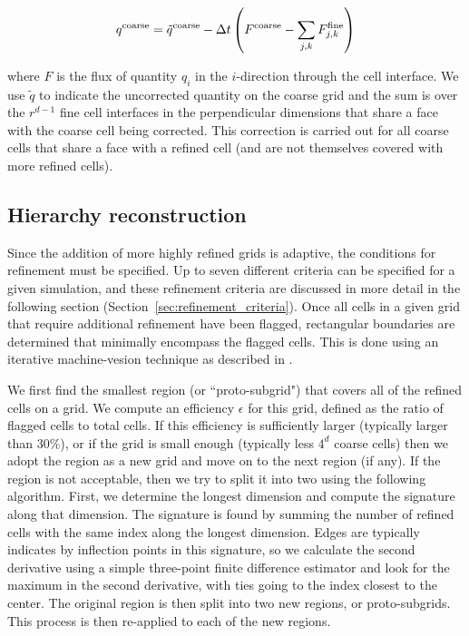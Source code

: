 \begin{equation}
  q^{\rm coarse} = \tilde{q}^{\rm coarse} - \Delta t \left( F^{\rm
      coarse} - \sum_{j,k} F^{\rm fine}_{j,k} \right)
\end{equation}

where $F$ is the flux of quantity $q_i$ in the $i$-direction through the cell interface.   We use $\tilde{q}$ to indicate the uncorrected quantity on the coarse grid and the sum is over the $r^{d-1}$ fine cell interfaces in the perpendicular dimensions that share a face with the coarse cell being corrected.  This correction is carried out for all coarse cells that share a face with a refined cell (and are not themselves covered with more refined cells).

\subsection{Hierarchy reconstruction}
\label{sec:hierarchy_reconstruction}

Since the addition of more highly refined grids is adaptive, the conditions for refinement must be specified.  Up to seven different criteria can be specified for a given simulation, and these refinement criteria are discussed in more detail in the following section (Section~\ref{sec:refinement_criteria}).   Once all cells in a given grid that require additional refinement have been flagged, rectangular boundaries are determined that minimally encompass the flagged cells.  This is done using an iterative machine-vesion technique as described in .  

We first find the smallest region (or ``proto-subgrid") that covers all of the refined cells on a grid.  We compute an efficiency $\epsilon$ for this grid, defined as the ratio of flagged cells to total cells.  If this efficiency is sufficiently larger (typically larger than 30\%), or if the grid is small enough (typically less $4^d$ coarse cells) then we adopt the region as a new grid and move on to the next region (if any).  If the region is not acceptable, then we try to split it into two using the following algorithm.  First, we determine the longest dimension and compute the signature along that dimension.  The signature is found by summing the number of refined cells with the same index along the longest dimension.  Edges are typically indicates by inflection points in this signature, so we calculate the second derivative using a simple three-point finite difference estimator and look for the maximum in the second derivative, with ties going to the index closest to the center.  The original region is then split into two new regions, or proto-subgrids.  This process is then re-applied to each of the new regions.

